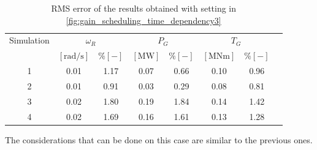 \begin{table}[!htbp]
  \caption{RMS error of the results obtained with setting in \autoref{fig:gain_scheduling_time_dependency3}}
  \centering
  \begin{tabular}{cccccccc}
    \toprule
      Simulation & \multicolumn{2}{c}{$\omega_R$} & \multicolumn{2}{c}{$P_G$} & \multicolumn{2}{c}{$T_G$} \\ 
       & $\left[\si{\radian\per\second}\right]$ & $ \% \left[-\right]$ & $\left[\si{\mega\watt}\right]$ & $ \% \left[-\right]$ & $\left[\si{\mega\newton\meter} \right]$ & $ \% \left[-\right]$ \\ \midrule        
     1 & 0.01 &  1.17 &  0.07  &  0.66  &  0.10  &  0.96  \\
     2 & 0.01 &  0.91 &  0.03  &  0.29  &  0.08  &  0.81  \\
     3 & 0.02 &  1.80 &  0.19  &  1.84  &  0.14  &  1.42  \\
     4 & 0.02 &  1.69 &  0.16  &  1.61  &  0.13  &  1.28 \\ 
    
     \bottomrule
  \end{tabular}
  \label{tab:res_variable_gains3}
\end{table}

The considerations that can be done on this case are similar to the previous ones. 

